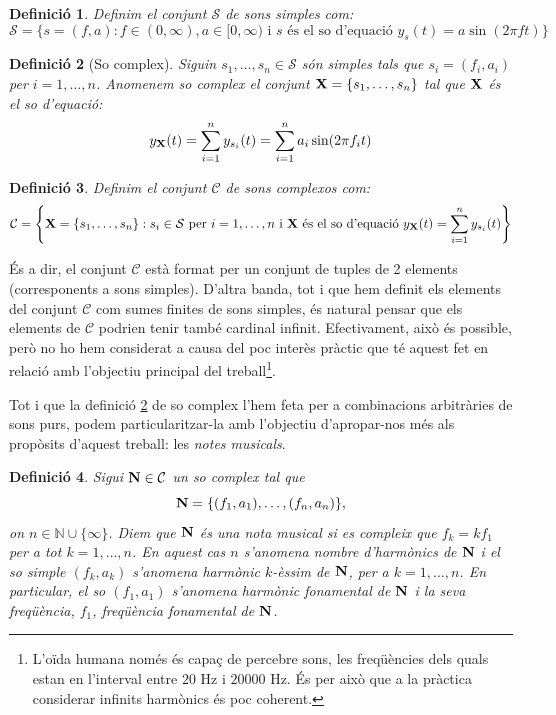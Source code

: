 \documentclass{article}
\theoremstyle{math}
\newtheorem{definition}{Definició}[section]
\theoremstyle{TheoremNum}
\newcommand{\0}{\ensuremath{\vb{0}}}
\newcommand{\N}{\ensuremath{\vb{N}}}
\newcommand{\X}{\ensuremath{\vb{X}}}
\newcommand{\NN}{\ensuremath{\mathbb{N}}} %
\newcommand\Hz{\text{ Hz}}
\begin{document}
\begin{definition}
    Definim el conjunt $\mathcal{S}$ de sons simples com: $$\mathcal{S}=\{s=(f,a):f\in(0,\infty),a\in[0,\infty)\text{ i $s$ és el so d'equació }y_s(t)=a\sin(2\pi ft)\}$$
\end{definition}
\begin{definition}[So complex]\label{so_complex}
Siguin $s_1,\ldots,s_n\in\mathcal{S}$ són simples tals que $s_i=(f_i,a_i)$ per $i=1,\ldots,n$. Anomenem \textit{so complex} el conjunt $\X=\{s_1,\ldots,s_n\}$ tal que $\X$ és el so d'equació: $$y_{\X}(t)=\sum_{i=1}^ny_{s_i}(t)=\sum_{i=1}^na_i\sin(2\pi f_it)$$
\end{definition}
\begin{definition}
    Definim el conjunt $\mathcal{C}$ de sons complexos com:
    $$\mathcal{C}=\left\{\X=\{s_1,\ldots,s_n\}:s_i\in\mathcal{S}\text{ per } i=1,\ldots,n\text{ i $\X$ és el so d'equació }y_{\X}(t)=\sum_{i=1}^ny_{s_i}(t)\right\}$$
\end{definition}
\noindent És a dir, el conjunt $\mathcal{C}$ està format per un conjunt de tuples de 2 elements (corresponents a sons simples). D'altra banda, tot i que hem definit els elements del conjunt $\mathcal{C}$ com sumes finites de sons simples, és natural pensar que els elements de $\mathcal{C}$ podrien tenir també cardinal infinit. Efectivament, això és possible, però no ho hem considerat a causa del poc interès pràctic que té aquest fet en relació amb l'objectiu principal del treball\footnote{L'oïda humana només és capaç de percebre sons, les freqüències dels quals estan en l'interval entre $20\Hz$ i $20000\Hz$. És per això que a la pràctica considerar infinits harmònics és poc coherent.}.\par
Tot i que la definició \ref{so_complex} de so complex l'hem feta per a combinacions arbitràries de sons purs, podem  particularitzar-la amb l'objectiu d'apropar-nos més als propòsits d'aquest treball: les \textit{notes musicals}.
\begin{definition}
    Sigui $\N\in\mathcal{C}$ un so complex tal que $$\N=\{(f_1,a_1),\ldots,(f_n,a_n)\},$$ on $n\in\NN\cup\{\infty\}$. Diem que $\N$ és una \textit{nota musical} si es compleix que $f_k=kf_1$ per a tot $k=1,\ldots,n$. En aquest cas $n$ s'anomena \textit{nombre d'harmònics de $\N$} i el so simple $(f_k,a_k)$ s'anomena \textit{harmònic $k$-èssim de $\N$}, per a $k=1,\ldots,n$. En particular, el so $(f_1,a_1)$ s'anomena \textit{harmònic fonamental de $\N$} i la seva freqüència, $f_1$, \textit{freqüència fonamental de $\N$}.
\end{definition}
\end{document}
